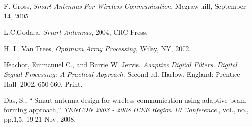 \documentclass[12pt,openright,a4paper]{report}
\begin{document}
\newpage
\pagestyle{empty}        %
\pagestyle{plain}           %

\newpage


\newpage

\newpage

\newpage

\tableofcontents

\listoffigures
{}
\listoftables
{}



\newpage
\pagestyle{plain}






\pagestyle{fancy}
\fancyhf{}
\rfoot{\thepage}

\renewcommand{\bibname}{References} %

\begin{thebibliography}{31}
\vspace{-0.6cm}

F. Gross, {\it Smart Antennas For Wireless Communication}, Mcgraw hill,
September 14, 2005.

L.C.Godara, {\it Smart Antennas}, 2004, CRC Press.

H. L. Van Trees, {\it Optimum Array Processing,} Wiley, NY, 2002.

Ifeachor, Emmanuel C., and Barrie W. Jervis. {\it Adaptive Digital Filters. Digital Signal Processing: A Practical Approach.} Second ed. Harlow, England: Prentice Hall, 2002. 650-660. Print.

Das, S., {\enquote{ Smart antenna design for wireless communication using adaptive beam-forming approach,}} {\it TENCON 2008 - 2008 IEEE Region 10 Conference} , vol., no., pp.1,5, 19-21 Nov. 2008.



\end{thebibliography}
\end{document}
